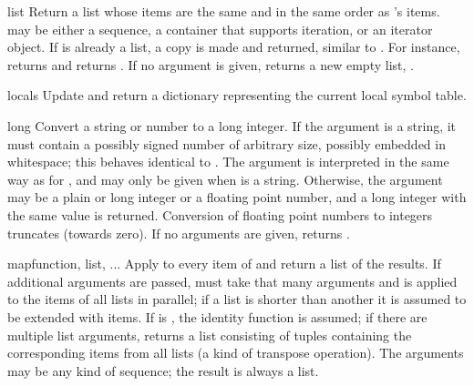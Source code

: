 \begin{funcdesc}{list}{}
  Return a list whose items are the same and in the same order as
  's items.   may be either a sequence, a
  container that supports iteration, or an iterator object.  If
   is already a list, a copy is made and returned,
  similar to .  For instance,
   returns \code{['a', 'b', 'c']} and  returns \code{[1, 2, 3]}.  If no argument is given,
  returns a new empty list, \code{[]}.
\end{funcdesc}

\begin{funcdesc}{locals}{}
  Update and return a dictionary representing the current local symbol table.
\end{funcdesc}

\begin{funcdesc}{long}{}
  Convert a string or number to a long integer.  If the argument is a
  string, it must contain a possibly signed number of
  arbitrary size, possibly embedded in whitespace;
  this behaves identical to .  The
   argument is interpreted in the same way as for
  , and may only be given when  is a string.
  Otherwise, the argument may be a plain or
  long integer or a floating point number, and a long integer with
  the same value is returned.    Conversion of floating
  point numbers to integers truncates (towards zero).  If no arguments
  are given, returns .
\end{funcdesc}

\begin{funcdesc}{map}{function, list, ...}
  Apply  to every item of  and return a list
  of the results.  If additional  arguments are passed,
   must take that many arguments and is applied to the
  items of all lists in parallel; if a list is shorter than another it
  is assumed to be extended with  items.  If 
  is , the identity function is assumed; if there are
  multiple list arguments,  returns a list consisting
  of tuples containing the corresponding items from all lists (a kind
  of transpose operation).  The  arguments may be any kind
  of sequence; the result is always a list.
\end{funcdesc}


